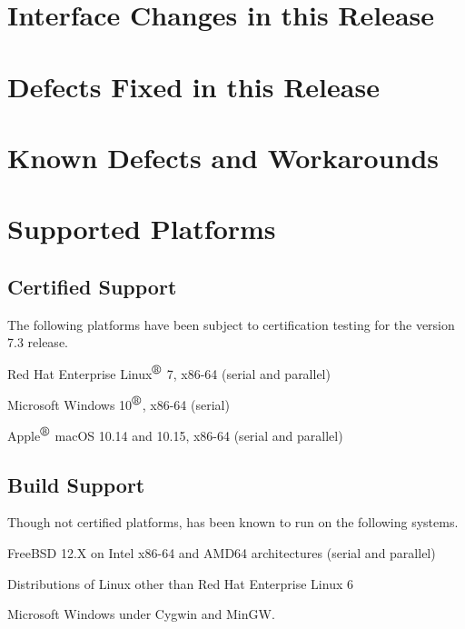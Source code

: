 \documentclass[letterpaper]{scrartcl}
\begin{document}
\newpage
\section{Interface Changes in this Release}


\newpage
\section{Defects Fixed in this Release}


\newpage
\section{Known Defects and Workarounds}


\newpage
\section{Supported Platforms}
\subsection*{Certified Support}
The following platforms have been subject to certification testing for the
\Xyce{} version 7.3 release.
\begin{XyceItemize}
  \item Red Hat Enterprise Linux${}^{\mbox{\textregistered}}$ 7, x86-64 (serial and parallel)
  \item Microsoft Windows 10${}^{\mbox{\textregistered}}$, x86-64 (serial)
  \item Apple${}^{\mbox{\textregistered}}$ macOS 10.14 and 10.15, x86-64 (serial and parallel)
\end{XyceItemize}


\subsection*{Build Support}
Though not certified platforms, \Xyce{} has been known to run on the following
systems.
\begin{XyceItemize}
  \item FreeBSD 12.X on Intel x86-64 and AMD64 architectures (serial
    and parallel)
  \item Distributions of Linux other than Red Hat Enterprise Linux 6
  \item Microsoft Windows under Cygwin and MinGW.
\end{XyceItemize}
\end{document}

